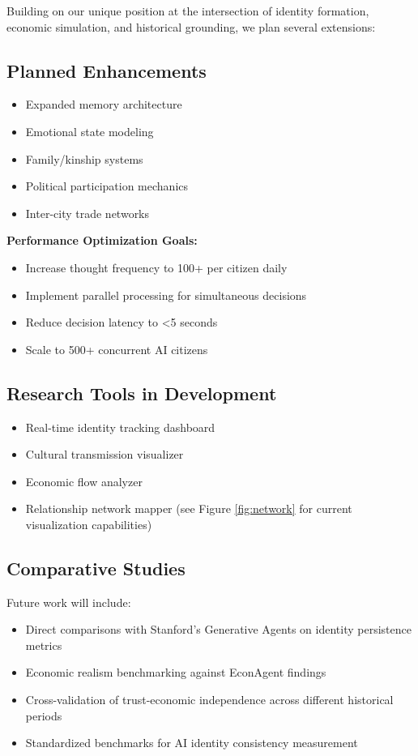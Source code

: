 \documentclass[11pt,a4paper]{article}
\begin{document}
Building on our unique position at the intersection of identity formation, economic simulation, and historical grounding, we plan several extensions:

\subsection{Planned Enhancements}

\begin{itemize}
\item Expanded memory architecture
\item Emotional state modeling
\item Family/kinship systems
\item Political participation mechanics
\item Inter-city trade networks
\end{itemize}

\textbf{Performance Optimization Goals:}
\begin{itemize}
\item Increase thought frequency to 100+ per citizen daily
\item Implement parallel processing for simultaneous decisions
\item Reduce decision latency to <5 seconds
\item Scale to 500+ concurrent AI citizens
\end{itemize}

\subsection{Research Tools in Development}

\begin{itemize}
\item Real-time identity tracking dashboard
\item Cultural transmission visualizer
\item Economic flow analyzer
\item Relationship network mapper (see Figure \ref{fig:network} for current visualization capabilities)
\end{itemize}

\subsection{Comparative Studies}

Future work will include:
\begin{itemize}
\item Direct comparisons with Stanford's Generative Agents on identity persistence metrics
\item Economic realism benchmarking against EconAgent findings
\item Cross-validation of trust-economic independence across different historical periods
\item Standardized benchmarks for AI identity consistency measurement
\end{itemize}
\end{document}
